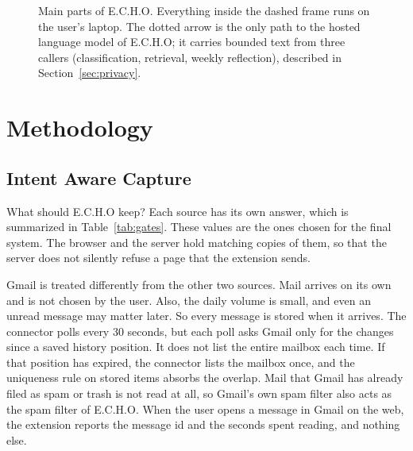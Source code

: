 \documentclass[conference]{IEEEtran}
\begin{document}
\begin{figure}[t]
\caption{Main parts of E.C.H.O. Everything inside the dashed frame runs on the user's laptop. The dotted arrow is the only path to the hosted language model of E.C.H.O; it carries bounded text from three callers (classification, retrieval, weekly reflection), described in Section~\ref{sec:privacy}.}
\label{fig:arch}
\end{figure}

\section{Methodology}\label{sec:method}
\subsection{Intent Aware Capture}
What should E.C.H.O keep? Each source has its own answer, which is summarized in Table~\ref{tab:gates}. These values are the ones chosen for the final system. The browser and the server hold matching copies of them, so that the server does not silently refuse a page that the extension sends.

Gmail is treated differently from the other two sources. Mail arrives on its own and is not chosen by the user. Also, the daily volume is small, and even an unread message may matter later. So every message is stored when it arrives. The connector polls every 30 seconds, but each poll asks Gmail only for the changes since a saved history position. It does not list the entire mailbox each time. If that position has expired, the connector lists the mailbox once, and the uniqueness rule on stored items absorbs the overlap. Mail that Gmail has already filed as spam or trash is not read at all, so Gmail's own spam filter also acts as the spam filter of E.C.H.O. When the user opens a message in Gmail on the web, the extension reports the message id and the seconds spent reading, and nothing else.
\end{document}
